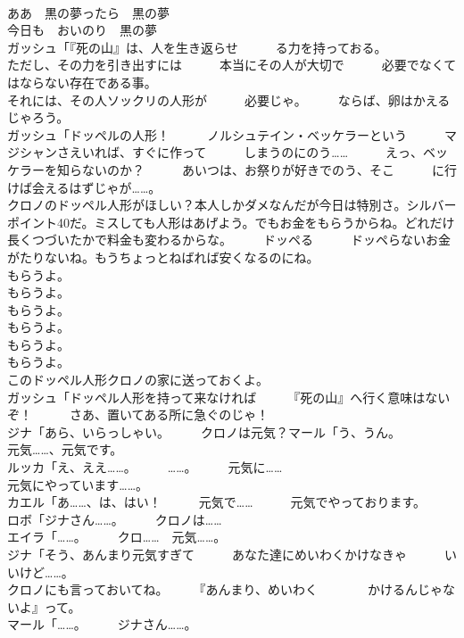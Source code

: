 \documentclass[8pt]{extreport}
\begin{document}
\begin{CJK}{UTF8}{min}
\\	ああ　黒の夢ったら　黒の夢
\\	今日も　おいのり　黒の夢
\\	ガッシュ「『死の山』は、人を生き返らせ　　　る力を持っておる。	
\\	ただし、その力を引き出すには　　　本当にその人が大切で　　　必要でなくてはならない存在である事。	
\\	それには、その人ソックリの人形が　　　必要じゃ。　　　ならば、卵はかえるじゃろう。	
\\	ガッシュ「ドッペルの人形！　　　ノルシュテイン・ベッケラーという　　　マジシャンさえいれば、すぐに作って　　　しまうのにのう……　　　えっ、ベッケラーを知らないのか？　　　あいつは、お祭りが好きでのう、そこ　　　に行けば会えるはずじゃが……。	
\\	クロノのドッペル人形がほしい？本人しかダメなんだが今日は特別さ。シルバーポイント40だ。ミスしても人形はあげよう。でもお金をもらうからね。どれだけ長くつづいたかで料金も変わるからな。　　　ドッペる　　　ドッペらないお金がたりないね。もうちょっとねばれば安くなるのにね。	
\\	もらうよ。	
\\	もらうよ。	
\\	もらうよ。	
\\	もらうよ。	
\\	もらうよ。	
\\	もらうよ。	
\\	このドッペル人形クロノの家に送っておくよ。	
\\	ガッシュ「ドッペル人形を持って来なければ　　　『死の山』へ行く意味はないぞ！　　　さあ、置いてある所に急ぐのじゃ！	
\\	ジナ「あら、いらっしゃい。　　　クロノは元気？マール「う、うん。	
\\	元気……、元気です。	
\\	ルッカ「え、ええ……。　　　……。　　　元気に……	
\\	元気にやっています……。	
\\	カエル「あ……、は、はい！　　　元気で……　　　元気でやっております。	
\\	ロボ「ジナさん……。　　　クロノは……	
\\	エイラ「……。　　　クロ……　元気……。	
\\	ジナ「そう、あんまり元気すぎて　　　あなた達にめいわくかけなきゃ　　　いいけど……。	
\\	クロノにも言っておいてね。　　　『あんまり、めいわく　　　　かけるんじゃないよ』って。	
\\	マール「……。　　　ジナさん……。	

\end{CJK}
\end{document}
